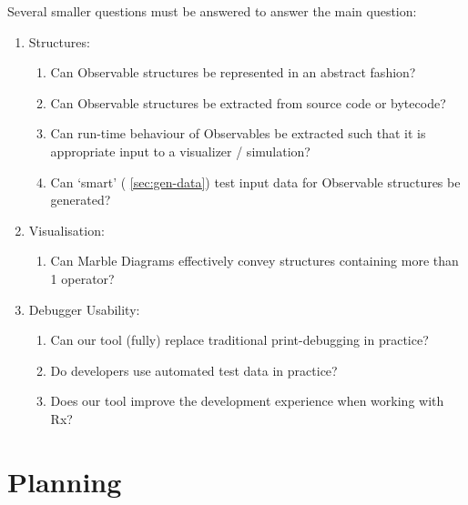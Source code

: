 \noindent
Several smaller questions must be answered to answer the main question:

\begin{enumerate}
    \item
        Structures:
        \begin{enumerate}
            \item
                Can Observable structures be represented in an abstract
                fashion?
            \item
                Can Observable structures be extracted from source code
                or bytecode?
            \item
                Can run-time behaviour of Observables be extracted such
                that it is appropriate input to a visualizer /
                simulation?
            \item
                Can `smart' (%
                \ref{sec:gen-data}) test input data for Observable
                structures be generated?
        \end{enumerate}

    \item
        Visualisation:
        \begin{enumerate}
            \item
                \label{qstn:marble} Can Marble Diagrams effectively
                convey structures containing more than 1 operator?
        \end{enumerate}

    \item
        Debugger Usability:
        \begin{enumerate}
            \item
                \label{qstn:println} Can our tool (fully) replace
                traditional print-debugging in practice?
            \item
                \label{qstn:autogen} Do developers use automated test
                data in practice?
            \item
                \label{qstn:experience} Does our tool improve the
                development experience when working with Rx?
        \end{enumerate}

\end{enumerate}

\section{Planning}

